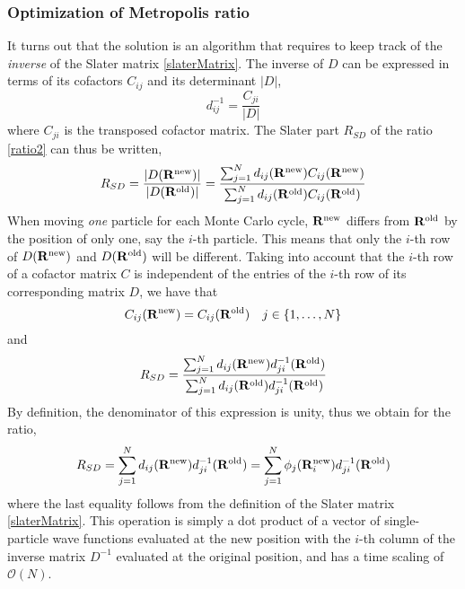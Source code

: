 \documentclass[english, a4paper]{article}
\begin{document}
\subsubsection{Optimization of Metropolis ratio}
\noindent It turns out that the solution is an algorithm that requires to keep track of the \textit{inverse}
of the Slater matrix \eqref{slaterMatrix}. The inverse of $D$ can be expressed in terms of its cofactors $C_{ij}$ and its
determinant $|D|$,
\begin{equation}
 d_{ij}^{-1} = \frac{C_{ji}}{|D|}
\end{equation}
where $C_{ji}$ is the transposed cofactor matrix. 
The Slater part $R_{SD}$ of the ratio \eqref{ratio2} can thus be written,
\begin{equation}
 R_{SD} = \frac{|D({\bf R}^{\textrm{new}})|}{|D({\bf R}^{\textrm{old}})|}
  = \frac{\sum_{j=1}^N d_{ij}({\bf R}^{\textrm{new}}) C_{ij}({\bf R}^{\textrm{new}})}
  {\sum_{j=1}^N d_{ij}({\bf R}^{\textrm{old}}) C_{ij}({\bf R}^{\textrm{old}})}
\end{equation}
When moving \textit{one} particle for each Monte Carlo cycle, ${\bf R}^{\textrm{new}}$ differs from 
${\bf R}^{\textrm{old}}$ by the position of only one, say the $i$-th particle. This means that
only the $i$-th row of $D({\bf R}^{\textrm{new}})$
and $D({\bf R}^{\textrm{old}})$ will be different. Taking into account that the $i$-th row of a cofactor matrix
$C$ is independent of the entries of the $i$-th row of its corresponding matrix $D$, we have that
\begin{equation}
 C_{ij}({\bf R}^{\textrm{new}}) = C_{ij}({\bf R}^{\textrm{old}}) \quad j \in \{1,\dots,N\}
\end{equation}
and
\begin{equation}
 R_{SD} = \frac{\sum_{j=1}^N d_{ij}({\bf R}^{\textrm{new}}) d_{ji}^{-1}({\bf R}^{\textrm{old}})}
  {\sum_{j=1}^N d_{ij}({\bf R}^{\textrm{old}}) d_{ji}^{-1}({\bf R}^{\textrm{old}})}
\end{equation}
By definition, the denominator of this expression is unity, thus we obtain for the ratio,
\begin{equation}
 R_{SD} = \sum_{j=1}^N d_{ij}({\bf R}^{\textrm{new}}) d_{ji}^{-1}({\bf R}^{\textrm{old}})
        = \sum_{j=1}^N \phi_j({\bf R}_i^{\textrm{new}}) d_{ji}^{-1}({\bf R}^{\textrm{old}})
        \label{slaterRatio}
\end{equation}
where the last equality follows from the definition of the Slater matrix \eqref{slaterMatrix}. 
This operation is simply a dot product of a vector of single-particle wave functions evaluated
at the new position with the $i$-th column of the inverse matrix $D^{-1}$ evaluated at the original position,
and has a time scaling of $\mathcal{O}(N)$.\\
\end{document}
